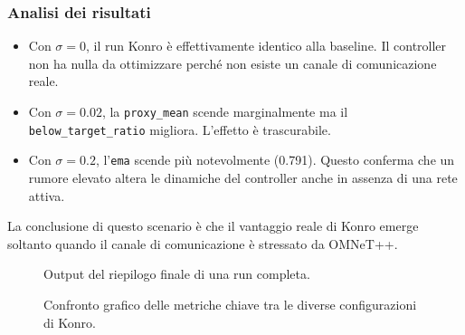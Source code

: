 \documentclass[12pt,a4paper]{article}
\begin{document}
\subsubsection{Analisi dei risultati}

\begin{itemize}
  \item Con $\sigma = 0$, il run Konro \`e effettivamente identico alla baseline.
        Il controller non ha nulla da ottimizzare perch\'e non esiste un canale
        di comunicazione reale.

  \item Con $\sigma = 0.02$, la \texttt{proxy\_mean} scende marginalmente ma
        il \texttt{below\_target\_ratio} migliora. L'effetto \`e trascurabile.

  \item Con $\sigma = 0.2$, l'\texttt{ema} scende pi\`u notevolmente (0.791).
        Questo conferma che un rumore elevato altera le dinamiche del controller
        anche in assenza di una rete attiva.
\end{itemize}

La conclusione di questo scenario \`e che il vantaggio reale di Konro emerge soltanto
quando il canale di comunicazione \`e stressato da OMNeT++.

\begin{figure}[H]
  \centering
  \caption{Output del riepilogo finale di una run completa.}
  \label{fig:summary}
\end{figure}

\begin{figure}[H]
  \centering
  \caption{Confronto grafico delle metriche chiave tra le diverse configurazioni di Konro.}
  \label{fig:chart}
\end{figure}
\end{document}
